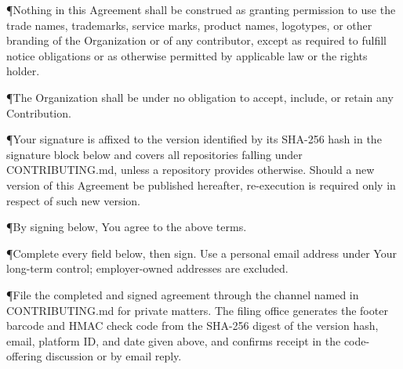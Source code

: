 
\P{}{Nothing in this Agreement shall be construed as granting permission to use the trade names, trademarks, service marks, product names, logotypes, or other branding of the Organization or of any contributor, except as required to fulfill notice obligations or as otherwise permitted by applicable law or the rights holder.}


\P{}{The Organization shall be under no obligation to accept, include, or retain any Contribution.}


\P{}{Your signature is affixed to the version identified by its SHA-256 hash in the signature block below and covers all repositories falling under CONTRIBUTING.md, unless a repository provides otherwise. Should a new version of this Agreement be published hereafter, re-execution is required only in respect of such new version.}


\P{}{By signing below, You agree to the above terms.}

\vskip 4mm 

\P{}{Complete every field below, then sign. Use a personal email address under Your long-term control; employer-owned addresses are excluded.}

    

\vskip 2mm 

\P{}{File the completed and signed agreement through the channel named in CONTRIBUTING.md for private matters. The filing office generates the footer barcode and HMAC check code from the SHA-256 digest of the version hash, email, platform ID, and date given above, and confirms receipt in the code-offering discussion or by email reply.}

\emitacroform

\bye
